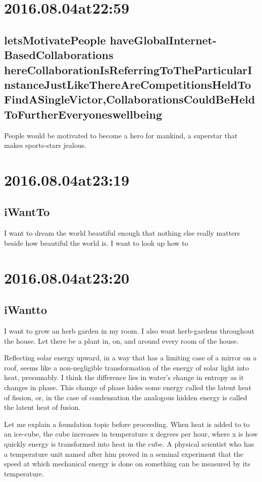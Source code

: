 \section*{ 2016.08.04at22:59 }
\subsection*{ letsMotivatePeople haveGlobalInternet-BasedCollaborations hereCollaborationIsReferringToTheParticularInstanceJustLikeThereAreCompetitionsHeldToFindASingleVictor,CollaborationsCouldBeHeldToFurtherEveryoneswellbeing }
People would be motivated to become a hero for mankind, a superstar that makes sports-stars jealous.

\section*{ 2016.08.04at23:19 }
\subsection*{ iWantTo }
I want to dream the world beautiful enough that nothing else really matters beside how beautiful the world is. I want to look up how to 

\section*{ 2016.08.04at23:20 }
\subsection*{ iWantto }
I want to grow an herb garden in my room. I also want herb-gardens throughout the house. Let there be a plant in, on, and around every room of the house.

Reflecting solar energy upward, in a way that has a limiting case of a mirror on a roof, seems like a non-negligible transformation of the energy of solar light into heat, presumably. I think the difference lies in water's change in entropy as it changes in phase. This change of phase hides some energy called the latent heat of fission, or, in the case of condensation the analogous hidden energy is called the latent heat of fusion.

Let me explain a foundation topic before proceeding. When heat is added to to an ice-cube, the cube increases in temperature x degrees per hour, where x is how quickly energy is transformed into heat in the cube. A physical scientist who has a temperature unit named after him proved in a seminal experiment that the speed at which mechanical energy is done on something can be measured by its temperature.

